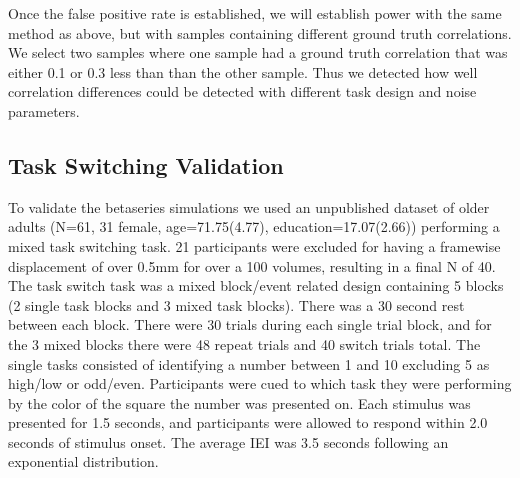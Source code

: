 \documentclass[10pt,letterpaper]{article}
\begin{document}
Once the false positive rate is established, we will establish power with the same method as above,
but with samples containing different ground truth correlations.
We select two samples where one sample had a ground truth
correlation that was either 0.1 or 0.3 less than than the other sample.
Thus we detected how well correlation differences could be detected
with different task design and noise parameters.

\subsection*{Task Switching Validation}
To validate the betaseries simulations we used an unpublished dataset
of older adults (N=61, 31 female, age=71.75(4.77), education=17.07(2.66)) performing a mixed task switching task.
21 participants were excluded for having a framewise displacement of over 0.5mm for
over a 100 volumes, resulting in a final N of 40.
The task switch task was a mixed block/event related design containing
5 blocks (2 single task blocks and 3 mixed task blocks).
There was a 30 second rest between each block.
There were 30 trials during each single trial block,
and for the 3 mixed blocks there were 48 repeat trials and 40 switch trials total.
The single tasks consisted of identifying a number between
1 and 10 excluding 5 as high/low or odd/even.
Participants were cued to which task they were performing by the color of the square
the number was presented on.
Each stimulus was presented for 1.5 seconds, and participants were allowed
to respond within 2.0 seconds of stimulus onset.
The average IEI was 3.5 seconds following an exponential distribution.
\end{document}
